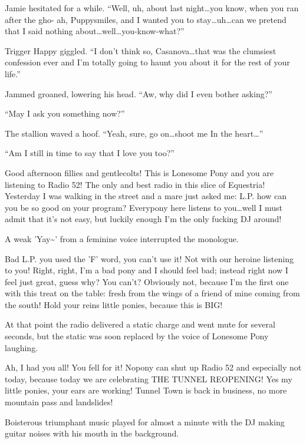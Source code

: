 Jamie hesitated for a while. ``Well, uh, about last night\dots you know, when you ran after the gho- ah, Puppysmiles, and I wanted you to stay\dots uh\dots can we pretend that I said nothing about\dots well\dots you-know-what?''

Trigger Happy giggled. ``I don't think so, Casanova\dots that was the clumsiest confession ever and I'm totally going to haunt you about it for the rest of your life.''

Jammed groaned, lowering his head. ``Aw, why did I even bother asking?''

``May I ask you something now?''

The stallion waved a hoof. ``Yeah, sure, go on\dots shoot me In the heart\dots''

``Am I still in time to say that I love you too?''

\horizonline


{\rt Good afternoon fillies and gentlecolts! This is Lonesome Pony and you are listening to Radio 52! The only and best radio in this slice of Equestria! Yesterday I was walking in the street and a mare just asked me: L.P. how can you be so good on your program? Everypony here listens to you\dots well I must admit that it's not easy, but luckily enough I'm the only fucking DJ around!}

A weak '{\rt Yay\textasciitilde}' from a feminine voice interrupted the monologue.

{\rt Bad L.P. you used the 'F' word, you can't use it! Not with our heroine listening to you! Right, right, I'm a bad pony and I should feel bad; instead right now I feel just great, guess why? You can't? Obviously not, because I'm the first one with this treat on the table: fresh from the wings of a friend of mine coming from the south! Hold your reins little ponies, because this is BIG!}

At that point the radio delivered a static charge and went mute for several seconds, but the static was soon replaced by the voice of Lonesome Pony laughing.

{\rt Ah, I had you all! You fell for it! Nopony can shut up Radio 52 and especially not today, because today we are celebrating THE TUNNEL REOPENING! Yes my little ponies, your ears are working! Tunnel Town is back in business, no more mountain pass and landslides!}

Boisterous triumphant music played for almost a minute with the DJ making guitar noises with his mouth in the background.

